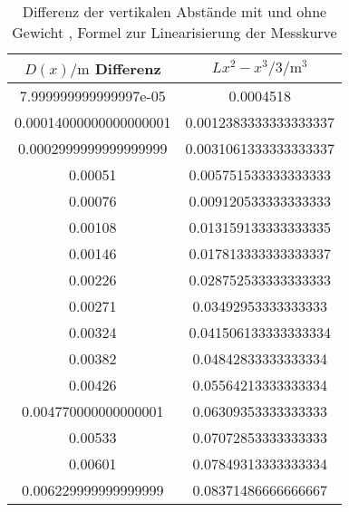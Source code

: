 \begin{table}\caption{Differenz der vertikalen Abstände mit und ohne Gewicht    , Formel zur Linearisierung der Messkurve}
\label{table: new2}
\centering
{}
\begin{tabular}{S[]S[]} 
\toprule
{$D(x)/\si{\meter}$ Differenz} & {$Lx^2-x^3/3 /\si{\cubic\meter}$}\\
\midrule
7.999999999999997e-05 & 0.0004518\\
0.00014000000000000001 & 0.0012383333333333337\\
0.0002999999999999999 & 0.0031061333333333337\\
0.00051 & 0.005751533333333333\\
0.00076 & 0.009120533333333333\\
0.00108 & 0.013159133333333335\\
0.00146 & 0.017813333333333337\\
0.00226 & 0.028752533333333333\\
0.00271 & 0.03492953333333333\\
0.00324 & 0.041506133333333334\\
0.00382 & 0.04842833333333334\\
0.00426 & 0.05564213333333334\\
0.004770000000000001 & 0.06309353333333333\\
0.00533 & 0.07072853333333333\\
0.00601 & 0.07849313333333334\\
0.006229999999999999 & 0.08371486666666667\\
\bottomrule
\end{tabular}\end{table}

